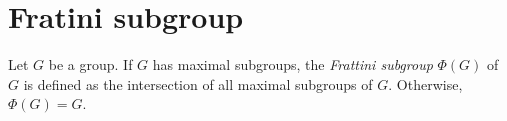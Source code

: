 %

%
%
%

\section*{Fratini subgroup}

Let $G$ be a group. If $G$ has maximal subgroups, the {\em Frattini subgroup}
$\Phi(G)$ of $G$ is defined as the intersection of all maximal subgroups of $G$. 
Otherwise, $\Phi(G)=G$. 

